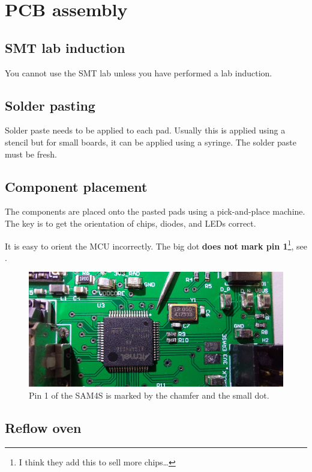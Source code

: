 \chapter{PCB assembly}


\section{SMT lab induction}

You cannot use the SMT lab unless you have performed a lab induction.


\section{Solder pasting}

Solder paste needs to be applied to each pad.  Usually this is applied
using a stencil but for small boards, it can be applied using a
syringe.  The solder paste must be fresh.


\section{Component placement}

The components are placed onto the pasted pads using a pick-and-place
machine.  The key is to get the orientation of chips, diodes, and LEDs
correct.

It is easy to orient the MCU incorrectly.  The big dot \textbf{does
  not mark pin 1}\footnote{I think they add this to sell more
  chips\ldots}, see .


\begin{figure}[!h]
  \centering
  \includegraphics[width=6in]{figs/sam4s_orientation.jpg}
  \caption{Pin 1 of the SAM4S is marked by the chamfer and the small
    dot.}
  \label{fig:pin1}
\end{figure}


\section{Reflow oven}

